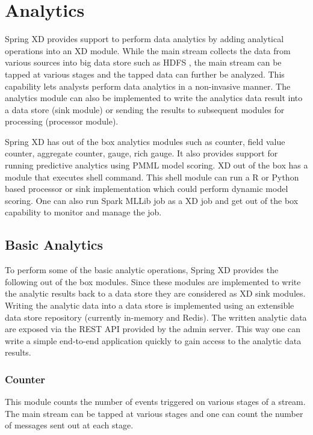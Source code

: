 \section{Analytics}

Spring XD provides support to perform data analytics by adding analytical operations into
an XD module. While the main stream collects the data from various sources into big data
store such as HDFS , the main stream can be tapped at various stages and the tapped data
can further be analyzed. This capability lets analysts perform data analytics in a
non-invasive manner. The analytics module can also be implemented to write the analytics
data result into a data store (sink module) or sending the results to subsequent modules
for processing (processor module). 

\par

Spring XD has out of the box analytics modules such as counter, field value counter,
aggregate counter, gauge, rich gauge. It also provides support for running predictive
analytics using PMML model scoring. XD out of the box has a module that executes
shell command. This shell module can run a R or Python based processor or sink 
implementation which could perform dynamic model scoring. One can also run Spark 
MLLib job as a XD job and get out of the box capability to monitor and manage the job.

\subsection {Basic Analytics}

To perform some of the basic analytic operations, Spring XD provides the following out of 
the box modules. Since these modules are implemented to write the analytic results 
back to a data store they are considered as XD sink modules. Writing the analytic 
data into a data store is implemented using an extensible data store repository 
(currently in-memory and Redis). 
The written analytic data are exposed via the REST API provided by the admin server.
This way one can write a simple end-to-end application quickly to gain access to the
analytic data results.

\subsubsection {Counter}

This module counts the number of events triggered on various stages of a stream.
The main stream can be tapped at various stages and one can count the number of
messages sent out at each stage.
 
